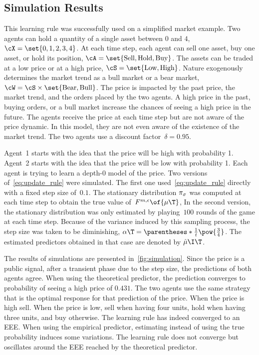 \subsection{Simulation Results}
This learning rule was successfully used on a simplified market example.
Two agents can hold a quantity of a single asset between \(0\) and \(4\), \(\cX = \set{0,1,2,3,4}\).
At each time step, each agent can sell one asset, buy one asset, or hold its position, \(\cA = \set{\text{Sell}, \text{Hold}, \text{Buy}}\).
The assets can be traded at a low price or at a high price, \(\cS=\set{\text{Low}, \text{High}}\).
Nature exogenously determines the market trend as a bull market or a bear market, \(\cW=\cS \times \set{\text{Bear}, \text{Bull}}\).
The price is impacted by the past price, the market trend, and the orders placed by the two agents.
A high price in the past, buying orders, or a bull market increase the chances of seeing a high price in the future.
The agents receive the price at each time step but are not aware of the price dynamic.
In this model, they are not even aware of the existence of the market trend.
The two agents use a discount factor~\(\delta=0.95\).

Agent~1 starts with the idea that the price will be high with probability 1.
Agent~2 starts with the idea that the price will be low with probability 1.
Each agent is trying to learn a depth-\(0\) model of the price.
Two versions of~\cref{eq:update_rule} were simulated.
The first one used~\cref{eq:update_rule} directly with a fixed step size of~\(0.1\).
The stationary distribution \(\pi_{\sigma}\) was computed at each time step to obtain the true value of~\(\FF \of{\mu\T}\),
In the second version, the stationary distribution was only estimated by playing~\(100\) rounds of the game at each time step.
Because of the variance induced by this sampling process, the step size was taken to be diminishing, \(\alpha\T = \parentheses*{\frac{1}{t}}\pow{\frac{3}{4}}\).
The estimated predictors obtained in that case are denoted by \(\hat{\mu}\I\T\).

The results of simulations are presented in~\cref{fig:simulation}.
Since the price is a public signal, after a transient phase due to the step size, the predictions of both agents agree.
When using the theoretical predictor, the prediction converges to probability of seeing a high price of \(0.431\).
The two agents use the same strategy that is the optimal response for that prediction of the price.
When the price is high sell.
When the price is low, sell when having four units, hold when having three units, and buy otherwise.
The learning rule has indeed converged to an EEE.
When using the empirical predictor, estimating instead of using the true probability induces some variations.
The learning rule does not converge but oscillates around the EEE reached by the theoretical predictor.

